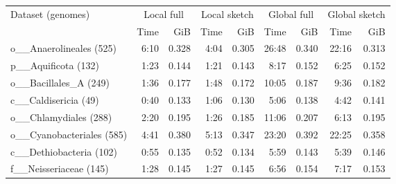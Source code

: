 \begin{tabular}{lrrrrrrrr}
\toprule
Dataset (genomes) & \multicolumn{2}{c}{Local full} & \multicolumn{2}{c}{Local sketch} & \multicolumn{2}{c}{Global full} & \multicolumn{2}{c}{Global sketch} \\
\cmidrule(lr){2-3}\cmidrule(lr){4-5}\cmidrule(lr){6-7}\cmidrule(lr){8-9}
 & Time & GiB & Time & GiB & Time & GiB & Time & GiB \\
\midrule
o\_\_Anaerolineales (525) & 6:10 & 0.328 & 4:04 & 0.305 & 26:48 & 0.340 & 22:16 & 0.313 \\
p\_\_Aquificota (132) & 1:23 & 0.144 & 1:21 & 0.143 & 8:17 & 0.152 & 6:25 & 0.152 \\
o\_\_Bacillales\_A (249) & 1:36 & 0.177 & 1:48 & 0.172 & 10:05 & 0.187 & 9:36 & 0.182 \\
c\_\_Caldisericia (49) & 0:40 & 0.133 & 1:06 & 0.130 & 5:06 & 0.138 & 4:42 & 0.141 \\
o\_\_Chlamydiales (288) & 2:20 & 0.195 & 1:26 & 0.185 & 11:06 & 0.207 & 6:13 & 0.195 \\
o\_\_Cyanobacteriales (585) & 4:41 & 0.380 & 5:13 & 0.347 & 23:20 & 0.392 & 22:25 & 0.358 \\
c\_\_Dethiobacteria (102) & 0:55 & 0.135 & 0:52 & 0.134 & 5:59 & 0.143 & 5:39 & 0.146 \\
f\_\_Neisseriaceae (145) & 1:28 & 0.145 & 1:27 & 0.145 & 6:56 & 0.154 & 7:17 & 0.153 \\
\bottomrule
\end{tabular}
